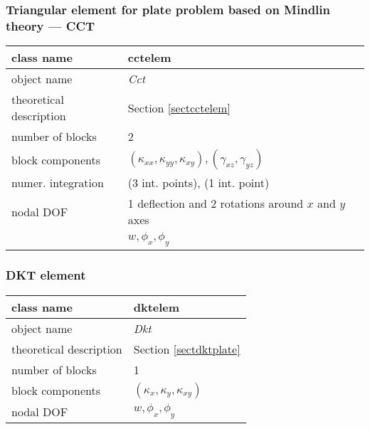 \subsubsection{Triangular element for plate problem ba\-sed on Mindlin theory --- CCT}

\begin{center}
\begin{tabular}{|l|l|}
\hline
class name & {\sf cctelem}\index{class!{\sf cctelem}}
\\ \hline
object name & {\it Cct}\index{instance!{\it Cct}}
\\ \hline
theoretical description & Section \ref{sectcctelem}
\\ \hline
number of blocks & 2
\\ \hline
block components & $(\kappa_{xx},\kappa_{yy},\kappa_{xy}), (\gamma_{xz},\gamma_{yz})$
\\ \hline
numer. integration & (3 int. points), (1 int. point)
\\ \hline
nodal DOF & 1 deflection and 2 rotations around $x$ and $y$ axes
\\ \cline{2-2}
 & $w, \phi_x, \phi_y$
\\ \hline
\end{tabular}
\end{center}

\subsubsection{DKT element}

\begin{center}
\begin{tabular}{|l|l|}
\hline
class name & {\sf dktelem}\index{class!{\sf dktelem}}
\\ \hline
object name & {\it Dkt}\index{instance!{\it Dkt}}
\\ \hline
theoretical description & Section \ref{sectdktplate}
\\ \hline
number of blocks & 1
\\ \hline
block components & $(\kappa_x,\kappa_y,\kappa_{xy})$
\\ \hline
nodal DOF & $w,\phi_x,\phi_y$
\\ \hline
\end{tabular}
\end{center}


